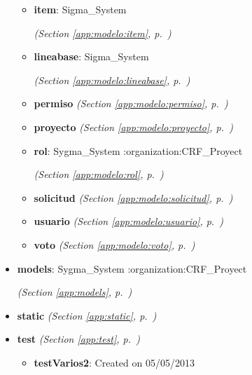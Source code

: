 \begin{itemize}
\begin{itemize}
    \item \textbf{item}: Sigma\_System



  \textit{(Section \ref{app:modelo:item}, p.~\pageref{app:modelo:item})}

    \item \textbf{lineabase}: Sigma\_System



  \textit{(Section \ref{app:modelo:lineabase}, p.~\pageref{app:modelo:lineabase})}

    \item \textbf{permiso}
  \textit{(Section \ref{app:modelo:permiso}, p.~\pageref{app:modelo:permiso})}

    \item \textbf{proyecto}
  \textit{(Section \ref{app:modelo:proyecto}, p.~\pageref{app:modelo:proyecto})}

    \item \textbf{rol}: Sygma\_System :organization:CRF\_Proyect



  \textit{(Section \ref{app:modelo:rol}, p.~\pageref{app:modelo:rol})}

    \item \textbf{solicitud}
  \textit{(Section \ref{app:modelo:solicitud}, p.~\pageref{app:modelo:solicitud})}

    \item \textbf{usuario}
  \textit{(Section \ref{app:modelo:usuario}, p.~\pageref{app:modelo:usuario})}

    \item \textbf{voto}
  \textit{(Section \ref{app:modelo:voto}, p.~\pageref{app:modelo:voto})}

  \end{itemize}
\item \textbf{models}: Sygma\_System :organization:CRF\_Proyect



  \textit{(Section \ref{app:models}, p.~\pageref{app:models})}

\item \textbf{static}
  \textit{(Section \ref{app:static}, p.~\pageref{app:static})}

\item \textbf{test}
  \textit{(Section \ref{app:test}, p.~\pageref{app:test})}

  \begin{itemize}
\setlength{\parskip}{0ex}
    \item \textbf{testVarios2}: Created on 05/05/2013




\end{itemize}
\end{itemize}
